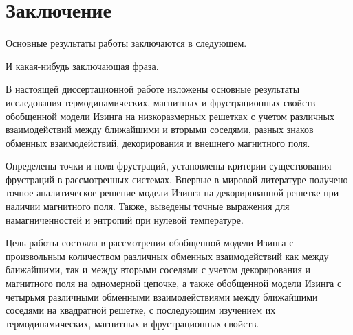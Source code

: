 \chapter*{Заключение}                       %


Основные результаты работы заключаются в следующем.

И какая-нибудь заключающая фраза.

В настоящей диссертационной работе изложены основные результаты исследования термодинамических, магнитных и фрустрационных свойств обобщенной модели Изинга на низкоразмерных решетках с учетом различных взаимодействий между ближайшими и вторыми соседями, разных знаков обменных взаимодействий, декорирования и внешнего магнитного поля.

Определены точки и поля фрустраций, установлены критерии существования фрустраций в рассмотренных системах. Впервые в мировой литературе получено точное аналитическое решение модели Изинга на декорированной решетке при наличии магнитного поля. Также, выведены точные выражения для намагниченностей и энтропий при нулевой температуре.

Цель работы состояла в рассмотрении обобщенной модели Изинга с произвольным количеством различных обменных взаимодействий как между ближайшими, так и между вторыми соседями с учетом декорирования и магнитного поля на одномерной цепочке, а также обобщенной модели Изинга с четырьмя различными обменными взаимодействиями между ближайшими соседями на квадратной решетке, с последующим изучением их термодинамических, магнитных и фрустрационных свойств.

